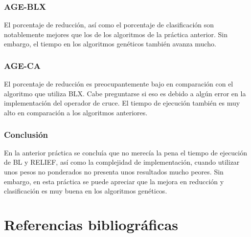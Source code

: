 \documentclass[12pt, spanish]{article}
\begin{document}
\subsubsection{AGE-BLX}
El porcentaje de reducción, así como el porcentaje de clasificación son notablemente mejores que los de los algoritmos de la práctica anterior. Sin embargo, el tiempo en los algoritmos genéticos también avanza mucho. 
\subsubsection{AGE-CA}
El porcentaje de reducción es preocupantemente bajo en comparación con el algoritmo que utiliza BLX. Cabe preguntarse si eso es debido a algún error en la implementación del operador de cruce. El tiempo de ejecución también es muy alto en comparación a los algoritmos anteriores. 
\subsubsection{}
\subsubsection{}
\subsubsection{}
\subsubsection{}
\subsubsection{}
\subsubsection{Conclusión}
En la anterior práctica se concluía que no merecía la pena el tiempo de ejecución de BL y RELIEF, así como la complejidad de implementación, cuando utilizar unos pesos no ponderados no presenta unos resultados mucho peores. Sin embargo, en esta práctica se puede apreciar que la mejora en reducción y clasificación es muy buena en los algoritmos genéticos. 
\pagebreak
\section{Referencias bibliográficas}
\end{document}
